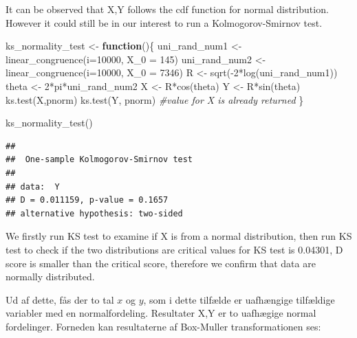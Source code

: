 \documentclass[
]{article}
\newenvironment{Shaded}{\begin{snugshade}}{\end{snugshade}}
\newcommand{\AttributeTok}[1]{\textcolor[rgb]{0.77,0.63,0.00}{#1}}
\newcommand{\CommentTok}[1]{\textcolor[rgb]{0.56,0.35,0.01}{\textit{#1}}}
\newcommand{\ControlFlowTok}[1]{\textcolor[rgb]{0.13,0.29,0.53}{\textbf{#1}}}
\newcommand{\DecValTok}[1]{\textcolor[rgb]{0.00,0.00,0.81}{#1}}
\newcommand{\FunctionTok}[1]{\textcolor[rgb]{0.00,0.00,0.00}{#1}}
\newcommand{\NormalTok}[1]{#1}
\newcommand{\OtherTok}[1]{\textcolor[rgb]{0.56,0.35,0.01}{#1}}
\newcommand{\SpecialCharTok}[1]{\textcolor[rgb]{0.00,0.00,0.00}{#1}}
\newcommand{\StringTok}[1]{\textcolor[rgb]{0.31,0.60,0.02}{#1}}
\begin{document}
It can be observed that X,Y follows the cdf function for normal
distribution. However it could still be in our interest to run a
Kolmogorov-Smirnov test.

\begin{Shaded}
\begin{Highlighting}[]
\NormalTok{ks\_normality\_test }\OtherTok{\textless{}{-}} \ControlFlowTok{function}\NormalTok{()\{}
\NormalTok{  uni\_rand\_num1 }\OtherTok{\textless{}{-}} \FunctionTok{linear\_congruence}\NormalTok{(}\AttributeTok{i=}\DecValTok{10000}\NormalTok{, }\AttributeTok{X\_0 =} \DecValTok{145}\NormalTok{)}
\NormalTok{  uni\_rand\_num2 }\OtherTok{\textless{}{-}} \FunctionTok{linear\_congruence}\NormalTok{(}\AttributeTok{i=}\DecValTok{10000}\NormalTok{, }\AttributeTok{X\_0 =} \DecValTok{7346}\NormalTok{)}
\NormalTok{  R }\OtherTok{\textless{}{-}} \FunctionTok{sqrt}\NormalTok{(}\SpecialCharTok{{-}}\DecValTok{2}\SpecialCharTok{*}\FunctionTok{log}\NormalTok{(uni\_rand\_num1))}
\NormalTok{  theta }\OtherTok{\textless{}{-}} \DecValTok{2}\SpecialCharTok{*}\NormalTok{pi}\SpecialCharTok{*}\NormalTok{uni\_rand\_num2}
\NormalTok{  X }\OtherTok{\textless{}{-}}\NormalTok{ R}\SpecialCharTok{*}\FunctionTok{cos}\NormalTok{(theta)}
\NormalTok{  Y }\OtherTok{\textless{}{-}}\NormalTok{ R}\SpecialCharTok{*}\FunctionTok{sin}\NormalTok{(theta)}
  \FunctionTok{ks.test}\NormalTok{(X,}\StringTok{\textquotesingle{}pnorm\textquotesingle{}}\NormalTok{)}
  \FunctionTok{ks.test}\NormalTok{(Y, }\StringTok{\textquotesingle{}pnorm\textquotesingle{}}\NormalTok{) }\CommentTok{\#value for X is already returned}
\NormalTok{\}}

\FunctionTok{ks\_normality\_test}\NormalTok{()}
\end{Highlighting}
\end{Shaded}

\begin{verbatim}
## 
##  One-sample Kolmogorov-Smirnov test
## 
## data:  Y
## D = 0.011159, p-value = 0.1657
## alternative hypothesis: two-sided
\end{verbatim}

We firstly run KS test to examine if X is from a normal distribution,
then run KS test to check if the two distributions are critical values
for KS test is 0.04301, D score is smaller than the critical score,
therefore we confirm that data are normally distributed.

Ud af dette, fås der to tal \(x\) og \(y\), som i dette tilfælde er
uafhængige tilfældige variabler med en normalfordeling. Resultater X,Y
er to uafhægige normal fordelinger. Forneden kan resultaterne af
Box-Muller transformationen ses:
\end{document}

